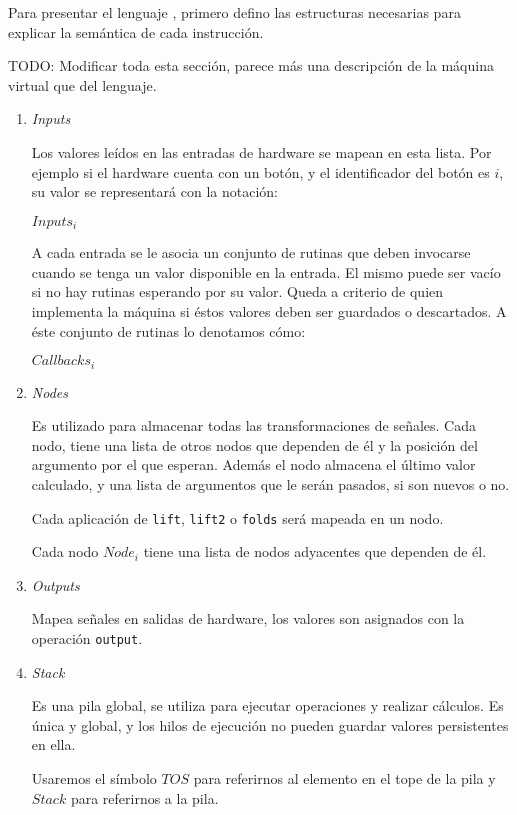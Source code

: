   Para presentar el lenguaje \alf{}, primero defino las estructuras
necesarias para explicar la semántica de cada instrucción.

  TODO: Modificar toda esta sección, parece más una descripción de la máquina
virtual que del lenguaje.

\begin{enumerate}

\item \emph{Inputs}

  Los valores leídos en las entradas de hardware se mapean
en esta lista. Por ejemplo si el hardware cuenta con un botón,
y el identificador del botón es $i$,
su valor se representará con la notación:

  $Inputs_i$

  A cada entrada se le asocia un conjunto de
rutinas que deben invocarse cuando se tenga un
valor disponible en la entrada. El mismo puede ser vacío si
no hay rutinas esperando por su valor. Queda a criterio de quien
implementa la máquina si éstos valores deben ser guardados o
descartados.
  A éste conjunto de rutinas lo denotamos cómo:

  $Callbacks_i$

\item \emph{Nodes}

  Es utilizado para almacenar todas las transformaciones de señales.
  Cada nodo, tiene una lista de otros nodos que dependen de él y la
  posición del argumento por el que esperan.
  Además el nodo almacena el último valor calculado, y una lista
  de argumentos que le serán pasados, si son nuevos o no.

  Cada aplicación de \texttt{lift}, \texttt{lift2} o \texttt{folds}
será mapeada en un nodo.

  Cada nodo $Node_i$ tiene una lista de nodos adyacentes
que dependen de él.

\item \emph{Outputs}

  Mapea señales en salidas de hardware, los valores
son asignados con la operación \texttt{output}.

\item \emph{Stack}

  Es una pila global, se utiliza para ejecutar operaciones y
realizar cálculos. 
  Es única y global, y los hilos de ejecución no pueden guardar valores
persistentes en ella.

Usaremos el símbolo $TOS$ para referirnos al elemento en el tope
de la pila y $Stack$ para referirnos a la pila.


\end{enumerate}
